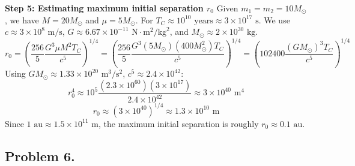 \begin{solution}
\textbf{Step 5: Estimating maximum initial separation $r_0$}
Given $m_1 = m_2 = 10 M_\odot$, we have $M = 20 M_\odot$ and $\mu = 5 M_\odot$.
For $T_C \approx 10^{10} \text{ years} \approx 3 \times 10^{17} \text{ s}$.
We use $c \approx 3 \times 10^8 \text{ m/s}$, $G \approx 6.67 \times 10^{-11} \text{ N}\cdot\text{m}^2/\text{kg}^2$, and $M_\odot \approx 2 \times 10^{30} \text{ kg}$.
\[ r_0 = \left( \frac{256}{5} \frac{G^3 \mu M^2 T_C}{c^5} \right)^{1/4} = \left( \frac{256}{5} \frac{G^3 (5 M_\odot) (400 M_\odot^2) T_C}{c^5} \right)^{1/4} = \left( 102400 \frac{(G M_\odot)^3 T_C}{c^5} \right)^{1/4} \]
Using $G M_\odot \approx 1.33 \times 10^{20} \text{ m}^3/\text{s}^2$, $c^5 \approx 2.4 \times 10^{42}$:
\[ r_0^4 \approx 10^5 \frac{(2.3 \times 10^{60}) (3 \times 10^{17})}{2.4 \times 10^{42}} \approx 3 \times 10^{40} \text{ m}^4 \]
\[ r_0 \approx (3 \times 10^{40})^{1/4} \approx 1.3 \times 10^{10} \text{ m} \]
Since $1 \text{ au} \approx 1.5 \times 10^{11} \text{ m}$, the maximum initial separation is roughly $r_0 \approx 0.1 \text{ au}$.
\end{solution}

\subsection*{Problem 6.}

